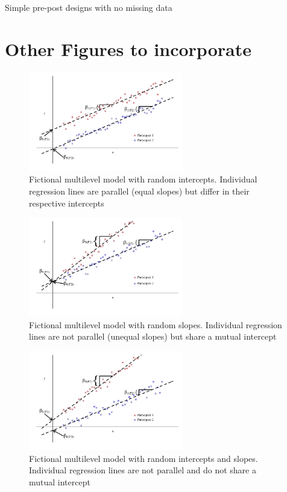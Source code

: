 \documentclass[
]{article}
\begin{document}
Simple pre-post designs with no missing data

\hypertarget{other-figures-to-incorporate}{%
\section{Other Figures to incorporate}\label{other-figures-to-incorporate}}

\begin{figure}[H]
\centering
\captionsetup{width=0.6\textwidth}
\includegraphics[width=0.6\textwidth]{rand_int.png}
\caption{Fictional multilevel model with random intercepts. Individual regression lines are parallel (equal slopes) but differ in their respective intercepts}
\label{fig-rand-int}
\end{figure}

\begin{figure}[H]
\centering
\captionsetup{width=0.6\textwidth}
\includegraphics[width=0.6\textwidth]{rand_slope.png}
\caption{Fictional multilevel model with random slopes. Individual regression lines are not parallel (unequal slopes) but share a mutual intercept}
\label{fig-rand-slope}
\end{figure}

\begin{figure}[H]
\centering
\captionsetup{width=0.6\textwidth}
\includegraphics[width=0.6\textwidth]{rand_int_slope.png}
\caption{Fictional multilevel model with random intercepts and slopes. Individual regression lines are not parallel and do not share a mutual intercept}
\label{fig-rand-int-slope}
\end{figure}
\end{document}
